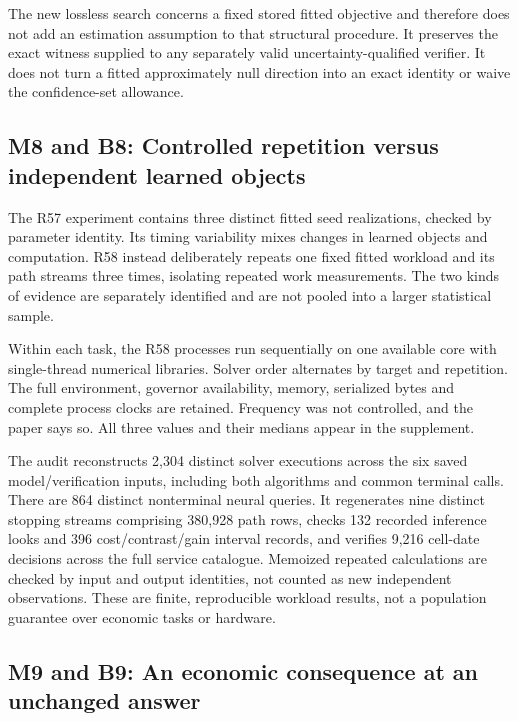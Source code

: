 \documentclass[ecta,nameyear,draft]{econsocart}
\begin{document}
The new lossless search concerns a fixed stored fitted objective and
therefore does not add an estimation assumption to that structural
procedure. It preserves the exact witness supplied to any separately
valid uncertainty-qualified verifier. It does not turn a fitted
approximately null direction into an exact identity or waive the
confidence-set allowance.

\hypertarget{m8-and-b8-controlled-repetition-versus-independent-learned-objects}{%
\subsection{M8 and B8: Controlled repetition versus independent learned
objects}\label{m8-and-b8-controlled-repetition-versus-independent-learned-objects}}

The R57 experiment contains three distinct fitted seed realizations,
checked by parameter identity. Its timing variability mixes changes in
learned objects and computation. R58 instead deliberately repeats one
fixed fitted workload and its path streams three times, isolating
repeated work measurements. The two kinds of evidence are separately
identified and are not pooled into a larger statistical sample.

Within each task, the R58 processes run sequentially on one available
core with single-thread numerical libraries. Solver order alternates by
target and repetition. The full environment, governor availability,
memory, serialized bytes and complete process clocks are retained.
Frequency was not controlled, and the paper says so. All three values
and their medians appear in the supplement.

The audit reconstructs 2,304 distinct solver executions across the six
saved model/verification inputs, including both algorithms and common
terminal calls. There are 864 distinct nonterminal neural queries. It
regenerates nine distinct stopping streams comprising 380,928 path rows,
checks 132 recorded inference looks and 396 cost/contrast/gain interval
records, and verifies 9,216 cell-date decisions across the full service
catalogue. Memoized repeated calculations are checked by input and
output identities, not counted as new independent observations. These
are finite, reproducible workload results, not a population guarantee
over economic tasks or hardware.

\hypertarget{m9-and-b9-an-economic-consequence-at-an-unchanged-answer}{%
\subsection{M9 and B9: An economic consequence at an unchanged
answer}\label{m9-and-b9-an-economic-consequence-at-an-unchanged-answer}}
\end{document}
